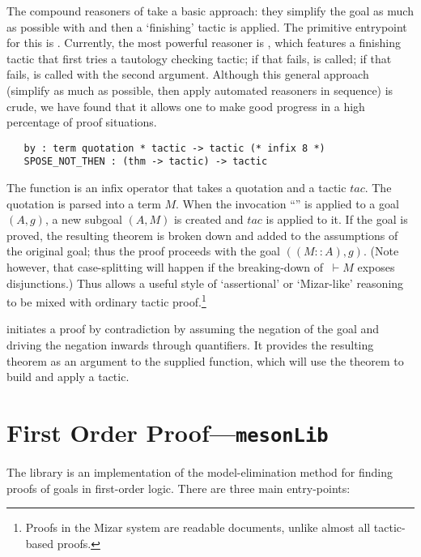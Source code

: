 The compound reasoners of  take a basic approach: they
simplify the goal as much as possible with  and then a
`finishing' tactic is applied. The primitive entrypoint for this is
. Currently, the most powerful reasoner is
, which features a finishing tactic that first
tries a tautology checking tactic; if that fails,  is
called; if that fails,  is called with the second
argument. Although this general approach (simplify as much as possible,
then apply automated reasoners in sequence) is crude, we have found that
it allows one to make good progress in a high percentage of proof
situations.

\begin{verbatim}
   by : term quotation * tactic -> tactic (* infix 8 *)
   SPOSE_NOT_THEN : (thm -> tactic) -> tactic
\end{verbatim}

The function  is an infix operator that takes a quotation
and a tactic $tac$. The quotation is parsed into a term $M$. When the
invocation ``'' is applied to a goal
$(A,g)$, a new subgoal $(A,M)$ is created and $tac$ is applied to it.
If the goal is proved, the resulting theorem is broken down and added
to the assumptions of the original goal; thus the proof proceeds with
the goal $((M::A), g)$. (Note however, that case-splitting will happen
if the breaking-down of $\ \vdash M$ exposes disjunctions.) Thus
 allows a useful style of `assertional' or `Mizar-like'
reasoning to be mixed with ordinary tactic proof.\footnote{Proofs in
  the Mizar system are readable documents, unlike almost all
  tactic-based proofs.}

 initiates a proof by contradiction by assuming
the negation of the goal and driving the negation inwards through
quantifiers. It provides the resulting theorem as an argument to the
supplied function, which will use the theorem to build and apply a
tactic.

\section{First Order Proof---\texttt{mesonLib}}
\label{sec:mesonLib}

The  library is an implementation of the
model-elimination method for finding proofs of goals in first-order
logic.  There are three main entry-points:

